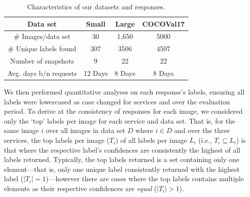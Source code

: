 \begin{table}[t]
\caption[Characteristics of data in computer vision evolution assessment]{Characteristics of our datasets and responses.}
\label{icsme2019:tab:dataset}
\centering
\begin{tabular}{c||c|c|c}
  \toprule
  \textbf{Data set} & \textbf{Small} & \textbf{Large} & \textbf{COCOVal17} \\
  \midrule
  \# Images/data set & 30 & 1,650 & 5000 \\
  \# Unique labels found & 307 & 3506 & 4507\\
  Number of snapshots & 9 & 22 & 22 \\
  Avg. days b/n requests & 12 Days & 8 Days & 8 Days \\
  \bottomrule
\end{tabular}
\end{table}


We then performed quantitative analyses on each response's labels, ensuring all labels were lowercased as case changed for services \googleapi{} and \awsapi{} over the evaluation period. To derive at the consistency of responses for each image, we considered only the `top' labels per image for each service and data set. That is, for the same image $i$ over all images in data set $D$ where $i \in D$ and over the three services, the top labels per image ($T_{i}$) of all labels per image $L_{i}$ (i.e., $T_{i} \subseteq L_{i}$) is that where the respective label's confidences are consistently the highest of all labels returned. 
Typically, the top labels returned is a set containing only one element---that is, only one unique label consistently returned with the highest label ($| T_{i} | = 1$)---however there are cases where the top labels contains multiple elements as their respective confidences are \textit{equal} ($| T_{i} | > 1$).


